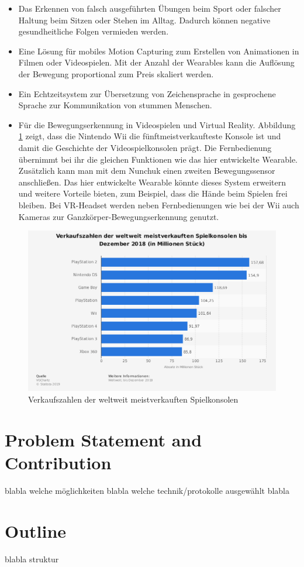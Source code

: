 \begin{itemize}
  \item Das Erkennen von falsch ausgeführten Übungen beim Sport oder falscher Haltung beim Sitzen oder Stehen im Alltag. Dadurch können negative gesundheitliche Folgen vermieden werden.
  \item Eine Lösung für mobiles Motion Capturing zum Erstellen von Animationen in Filmen oder Videospielen. Mit der Anzahl der Wearables kann die Auflösung der Bewegung proportional zum Preis skaliert werden.
  \item Ein Echtzeitsystem zur Übersetzung von Zeichensprache in gesprochene Sprache zur Kommunikation von stummen Menschen.
  \item Für die Bewegungserkennung in Videospielen und Virtual Reality. Abbildung \ref{fig:stat_konsolen} zeigt, dass die Nintendo Wii die fünftmeistverkaufteste Konsole ist und damit die Geschichte der Videospielkonsolen prägt. Die Fernbedienung übernimmt bei ihr die gleichen Funktionen wie das hier entwickelte Wearable. Zusätzlich kann man mit dem Nunchuk einen zweiten Bewegungssensor anschließen. Das hier entwickelte Wearable könnte dieses System erweitern und weitere Vorteile bieten, zum Beispiel, dass die Hände beim Spielen frei bleiben. Bei VR-Headset werden neben Fernbedienungen wie bei der Wii auch Kameras zur Ganzkörper-Bewegungserkennung genutzt.
\end{itemize}
\begin{figure}[h]
  \centering
  \includegraphics[width=0.75\linewidth]{res/01_statistic_id160549_weltweit-meistverkaufte-spielkonsolen-bis-dezember-2018.png}
  \caption{Verkaufszahlen der weltweit meistverkauften Spielkonsolen \cite{statistik_konsolen}}
  \label{fig:stat_konsolen}
\end{figure}


\section{Problem Statement and Contribution}
blabla welche möglichkeiten blabla welche technik/protokolle ausgewählt blabla

\section{Outline}
blabla struktur
